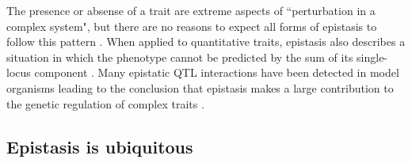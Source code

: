 The presence or absense of a trait are extreme aspects of ``perturbation in a complex system", but there are no reasons to expect all forms of epistasis to follow this pattern \cite{phillips2008epistasis}.
When applied to quantitative traits, epistasis also describes a situation in which the phenotype cannot be predicted by the sum of its single-locus component \cite{carlborg2004epistasis}.
Many epistatic QTL interactions have been detected in model organisms leading to the conclusion that epistasis makes a large contribution to the genetic regulation of complex traits  \cite{carlborg2004epistasis}.



\subsection{Epistasis is ubiquitous}

